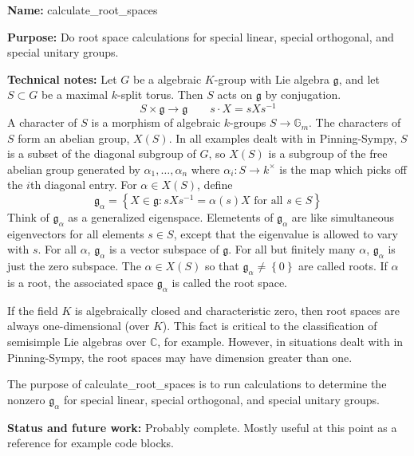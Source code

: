 \documentclass[12pt]{article}
\newcommand{\C}{\mathbb{C}}
\newcommand{\G}{\mathbb{G}}
\newcommand{\lb}{\left\{}
\newcommand{\rb}{\right\}}
\newcommand{\tbf}{\textbf}
\newcommand{\inv}{^{-1}}
\newcommand{\frakg}{\mathfrak{g}}
\begin{document}
\begin{mdframed}[linecolor=black]
\tbf{Name:} calculate\_root\_spaces

\smallskip

\tbf{Purpose:} Do root space calculations for special linear, special orthogonal, and special unitary groups.

\smallskip

\tbf{Technical notes:} Let $G$ be a algebraic $K$-group with Lie algebra $\frakg$, and let $S \subset G$ be a maximal $k$-split torus. Then $S$ acts on $\frakg$ by conjugation.
\[
	S \times \frakg \to \frakg \qquad s \cdot X = sXs \inv
\]
A character of $S$ is a morphism of algebraic $k$-groups $S \to \G_m$. The characters of $S$ form an abelian group, $X(S)$. In all examples dealt with in Pinning-Sympy, $S$ is a subset of the diagonal subgroup of $G$, so $X(S)$ is a subgroup of the free abelian group generated by $\alpha_1, \ldots, \alpha_n$ where $\alpha_i:S \to k^\times$ is the map which picks off the $i$th diagonal entry. For $\alpha \in X(S)$, define
\[
	\frakg_\alpha = \lb X \in \frakg: sXs \inv = \alpha(s) X \text{ for all } s \in S \rb
\]
Think of $\frakg_\alpha$ as a generalized eigenspace. Elemetents of $\frakg_\alpha$ are like simultaneous eigenvectors for all elements $s \in S$, except that the eigenvalue is allowed to vary with $s$. For all $\alpha$, $\frakg_\alpha$ is a vector subspace of $\frakg$. For all but finitely many $\alpha$, $\frakg_\alpha$ is just the zero subspace. The $\alpha \in X(S)$ so that $\frakg_\alpha \neq \lb 0 \rb$ are called roots. If $\alpha$ is a root, the associated space $\frakg_\alpha$ is called the root space.

If the field $K$ is algebraically closed and characteristic zero, then root spaces are always one-dimensional (over $K$). This fact is critical to the classification of semisimple Lie algebras over $\C$, for example. However, in situations dealt with in Pinning-Sympy, the root spaces may have dimension greater than one.

The purpose of calculate\_root\_spaces is to run calculations to determine the nonzero $\frakg_\alpha$ for special linear, special orthogonal, and special unitary groups.

\smallskip

\tbf{Status and future work:} Probably complete. Mostly useful at this point as a reference for example code blocks.

\end{mdframed}
\end{document}
